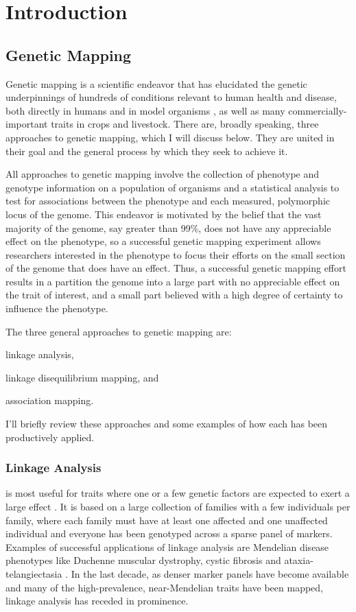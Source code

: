 \chapter{Introduction}

\section{Genetic Mapping}

Genetic mapping is a scientific endeavor that has elucidated the genetic underpinnings of hundreds of conditions relevant to human health and disease, both directly in humans \citep{MacArthur2017} and in model organisms \citep{Grubb2014a}, as well as many commercially-important traits in crops and livestock.
There are, broadly speaking, three approaches to genetic mapping, which I will discuss below.
They are united in their goal and the general process by which they seek to achieve it.

All approaches to genetic mapping involve the collection of phenotype and genotype information on a population of organisms and a statistical analysis to test for associations between the phenotype and each measured, polymorphic locus of the genome.
This endeavor is motivated by the belief that the vast majority of the genome, say greater than 99\%, does not have any appreciable effect on the phenotype, so a successful genetic mapping experiment allows researchers interested in the phenotype to focus their efforts on the small section of the genome that does have an effect.
Thus, a successful genetic mapping effort results in a partition the genome into a large part with no appreciable effect on the trait of interest, and a small part believed with a high degree of certainty to influence the phenotype.

The three general approaches to genetic mapping are:
\begin{enumerate*}
	\item linkage analysis, 
	\item linkage disequilibrium mapping, and
	\item association mapping.
\end{enumerate*}
I'll briefly review these approaches and some examples of how each has been productively applied.
\subsection{Linkage Analysis} is most useful for traits where one or a few genetic factors are expected to exert a large effect \citep{Elston1971,Haseman1972}.
	It is based on a large collection of families with a few individuals per family, where each family must have at least one affected and one unaffected individual and everyone has been genotyped across a sparse panel of markers.
	Examples of successful applications of linkage analysis are Mendelian disease phenotypes like Duchenne muscular dystrophy, \citep{Brown1985,Murray1982} cystic fibrosis \citep{Tsui1985,Wainwright1985,White1985} and ataxia-telangiectasia \citep{Gatti1988}.
	In the last decade, as denser marker panels have become available and many of the high-prevalence, near-Mendelian traits have been mapped, linkage analysis has receded in prominence.
	

